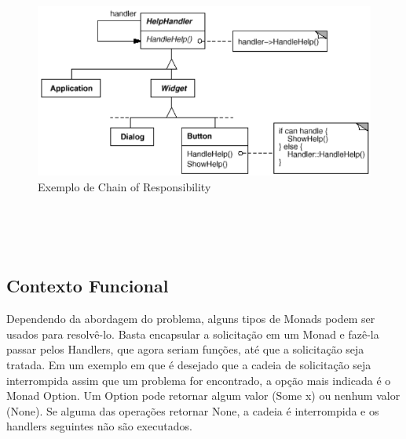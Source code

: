 \begin{figure}[htb]
	\caption{\label{chain_exemplo}Exemplo de Chain of Responsibility}
	\begin{center}
	    \includegraphics[scale=0.5]{5_padroes-contexto-funcional/5.3_comportamentais/5.3.01_chain-of-responsibility/chain-of-responsibility_exemplo.png}
	\end{center}
\end{figure}

\begin{lstlisting}[caption={Chain of Responsibility Orientação a Objetos},label=oochresponsibility]


    
\end{lstlisting}

\subsection*{Contexto Funcional}

Dependendo da abordagem do problema, alguns tipos de Monads 
podem ser usados para resolvê-lo. Basta encapsular a 
solicitação em um Monad e fazê-la passar pelos Handlers, que 
agora seriam funções, até que a solicitação seja tratada. Em 
um exemplo em que é desejado que a cadeia de solicitação seja 
interrompida assim que um problema for encontrado, a opção 
mais indicada é o Monad Option. Um Option pode retornar algum 
valor (Some x) ou nenhum valor (None). Se alguma das operações 
retornar None, a cadeia é interrompida e os handlers 
seguintes não são executados.

\begin{lstlisting}[caption={Chain of Responsibility Funcional},label=fpchresponsibility]
    

    
\end{lstlisting}